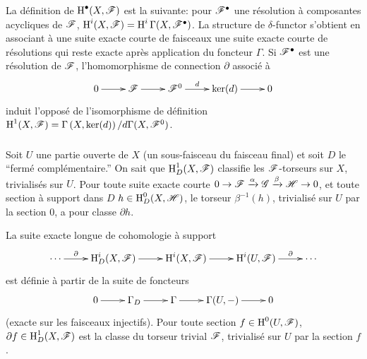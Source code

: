 \subsubsection{}\label{IV:1-1-3}

La d\'efinition de $\operatorname{H}^\bullet(X,\mathscr{F})$ est la suivante: pour $\mathscr{F}^\bullet$ une 
r\'esolution \`a composantes acycliques de $\mathscr{F}$, 
$\operatorname{H}^i(X,\mathscr{F}) = \operatorname{H}^i\Gamma(X,\mathscr{F}^\bullet)$. La structure de $\delta$-functor 
s'obtient en associant \`a une suite exacte courte de faisceaux une suite 
exacte courte de r\'esolutions qui reste exacte apr\`es application du 
foncteur $\Gamma$. Si $\mathscr{F}^\bullet$ est une r\'esolution de $\mathscr{F}$, 
l'homomorphisme de connection $\partial$ associ\'e \`a 
\[\xymatrix{
  0 \ar[r]
    & \cF \ar[r]
    & \cF^0 \ar[r]^-d 
    & \ker(d) \ar[r] 
    & 0
}\]
induit l'oppos\'e de l'isomorphisme de d\'efinition 
$\operatorname{H}^1(X,\mathscr{F}) = \Gamma\left(X,\ker(d)\right)/d \Gamma(X,\mathscr{F}^0)$. 





\subsubsection{}\label{IV:1-1-4}

Soit $U$ une partie ouverte de $X$ (un sous-faisceau du faisceau final) et 
soit $D$ le ``ferm\'e compl\'ementaire.'' On sait que $\operatorname{H}_D^1(X,\mathscr{F})$ 
classifie les $\mathscr{F}$-torseurs sur $X$, trivialis\'es sur $U$. Pour toute suite 
exacte courte $0\to \mathscr{F}\xrightarrow\alpha \mathscr{G}\xrightarrow\beta\mathscr{H}\to 0$, et 
toute section \`a support dans $D$ $h\in\operatorname{H}_D^0(X,\mathscr{H})$, le torseur 
$\beta^{-1}(h)$, trivialis\'e sur $U$ par la section $0$, a pour classe 
$\partial h$.

La suite exacte longue de cohomologie \`a support
\[\xymatrix{
  \cdots \ar[r]^-\partial 
    & \h_D^i(X,\cF) \ar[r] 
    & \h^i(X,\cF) \ar[r]
    & \h^i(U,\cF) \ar[r]^-\partial 
    & \cdots
}\]
est d\'efinie \`a partir de la suite de foncteurs 
\[\xymatrix{
  0 \ar[r] 
    & \Gamma_D \ar[r] 
    & \Gamma \ar[r] 
    & \Gamma(U,-) \ar[r] 
    & 0
}\]
(exacte sur les faisceaux injectifs). Pour toute section $f\in \operatorname{H}^0(U,\mathscr{F})$, 
$\partial f\in \operatorname{H}_D^1(X,\mathscr{F})$ est la classe du torseur trivial $\mathscr{F}$, 
trivialis\'e sur $U$ par la section $f$. 





\subsubsection{}\label{IV:1-1-5}

